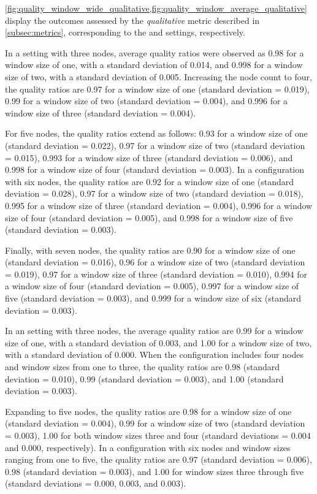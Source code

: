 \cref{fig:quality_window_wide_qualitative,fig:quality_window_average_qualitative} display the outcomes assessed by the \emph{qualitative} metric described in \cref{subsec:metrics}, corresponding to the \wide and \average settings, respectively.

In a \wide setting with three nodes, average quality ratios were observed as 0.98 for a window size of one, with a standard deviation of 0.014, and 0.998 for a window size of two, with a standard deviation of 0.005. Increasing the node count to four, the quality ratios are 0.97 for a window size of one (standard deviation = 0.019), 0.99 for a window size of two (standard deviation = 0.004), and 0.996 for a window size of three (standard deviation = 0.004).

For five nodes, the quality ratios extend as follows: 0.93 for a window size of one (standard deviation = 0.022), 0.97 for a window size of two (standard deviation = 0.015), 0.993 for a window size of three (standard deviation = 0.006), and 0.998 for a window size of four (standard deviation = 0.003). In a configuration with six nodes, the quality ratios are 0.92 for a window size of one (standard deviation = 0.028), 0.97 for a window size of two (standard deviation = 0.018), 0.995 for a window size of three (standard deviation = 0.004), 0.996 for a window size of four (standard deviation = 0.005), and 0.998 for a window size of five (standard deviation = 0.003).

Finally, with seven nodes, the quality ratios are 0.90 for a window size of one (standard deviation = 0.016), 0.96 for a window size of two (standard deviation = 0.019), 0.97 for a window size of three (standard deviation = 0.010), 0.994 for a window size of four (standard deviation = 0.005), 0.997 for a window size of five (standard deviation = 0.003), and 0.999 for a window size of six (standard deviation = 0.003).

In an \average setting with three nodes, the average quality ratios are 0.99 for a window size of one, with a standard deviation of 0.003, and 1.00 for a window size of two, with a standard deviation of 0.000. When the configuration includes four nodes and window sizes from one to three, the quality ratios are 0.98 (standard deviation = 0.010), 0.99 (standard deviation = 0.003), and 1.00 (standard deviation = 0.003).

Expanding to five nodes, the quality ratios are 0.98 for a window size of one (standard deviation = 0.004), 0.99 for a window size of two (standard deviation = 0.003), 1.00 for both window sizes three and four (standard deviations = 0.004 and 0.000, respectively). In a configuration with six nodes and window sizes ranging from one to five, the quality ratios are 0.97 (standard deviation = 0.006), 0.98 (standard deviation = 0.003), and 1.00 for window sizes three through five (standard deviations = 0.000, 0.003, and 0.003).

